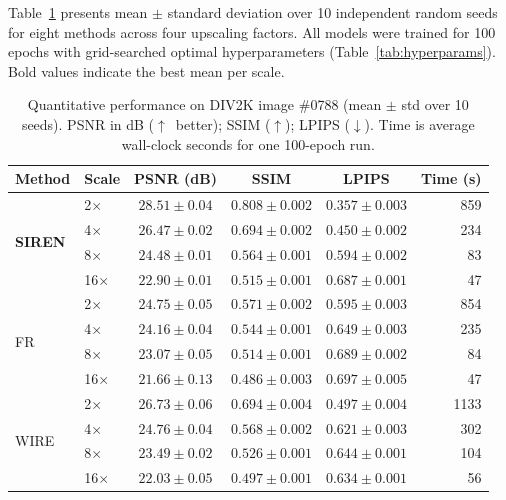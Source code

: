 \documentclass[a4paper,oneside,10pt,ngerman,english]{scrartcl}
\begin{document}
Table~\ref{tab:main_results} presents mean $\pm$ standard deviation over 10 independent random seeds for eight methods across four upscaling factors. All models were trained for 100 epochs with grid-searched optimal hyperparameters (Table~\ref{tab:hyperparams}). Bold values indicate the best mean per scale.

\begin{table}[htbp]
\centering
\caption{Quantitative performance on DIV2K image \#0788 (mean $\pm$ std over 10 seeds). PSNR in dB ($\uparrow$~better); SSIM ($\uparrow$); LPIPS ($\downarrow$). Time is average wall-clock seconds for one 100-epoch run.}
\label{tab:main_results}
\small
\renewcommand{\arraystretch}{1.05}
\setlength{\tabcolsep}{3pt}
\begin{tabular}{llccc r}
\toprule
\textbf{Method} & \textbf{Scale} & \textbf{PSNR (dB)} & \textbf{SSIM} & \textbf{LPIPS} & \textbf{Time (s)} \\
\midrule
\multirow{4}{*}{\textbf{SIREN}}
& 2$\times$  & $\mathbf{28.51 \pm 0.04}$ & $\mathbf{0.808 \pm 0.002}$ & $\mathbf{0.357 \pm 0.003}$ & 859 \\
& 4$\times$  & $\mathbf{26.47 \pm 0.02}$ & $\mathbf{0.694 \pm 0.002}$ & $\mathbf{0.450 \pm 0.002}$ & 234 \\
& 8$\times$  & $\mathbf{24.48 \pm 0.01}$ & $\mathbf{0.564 \pm 0.001}$ & $\mathbf{0.594 \pm 0.002}$ & 83 \\
& 16$\times$ & $\mathbf{22.90 \pm 0.01}$ & $\mathbf{0.515 \pm 0.001}$ & $0.687 \pm 0.001$ & 47 \\
\midrule
\multirow{4}{*}{FR}
& 2$\times$  & $24.75 \pm 0.05$ & $0.571 \pm 0.002$ & $0.595 \pm 0.003$ & 854 \\
& 4$\times$  & $24.16 \pm 0.04$ & $0.544 \pm 0.001$ & $0.649 \pm 0.003$ & 235 \\
& 8$\times$  & $23.07 \pm 0.05$ & $0.514 \pm 0.001$ & $0.689 \pm 0.002$ & 84 \\
& 16$\times$ & $21.66 \pm 0.13$ & $0.486 \pm 0.003$ & $0.697 \pm 0.005$ & 47 \\
\midrule
\multirow{4}{*}{WIRE}
& 2$\times$  & $26.73 \pm 0.06$ & $0.694 \pm 0.004$ & $0.497 \pm 0.004$ & 1133 \\
& 4$\times$  & $24.76 \pm 0.04$ & $0.568 \pm 0.002$ & $0.621 \pm 0.003$ & 302 \\
& 8$\times$  & $23.49 \pm 0.02$ & $0.526 \pm 0.001$ & $0.644 \pm 0.001$ & 104 \\
& 16$\times$ & $22.03 \pm 0.05$ & $0.497 \pm 0.001$ & $0.634 \pm 0.001$ & 56 \\

\end{tabular}
\end{table}
\end{document}
